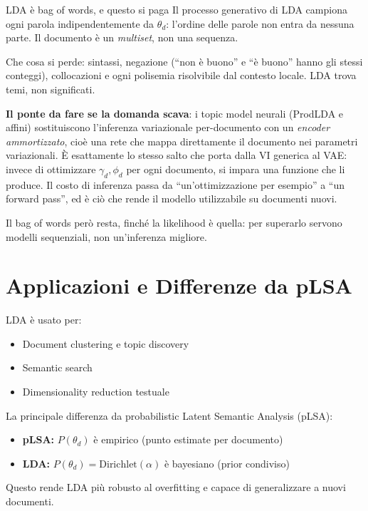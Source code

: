 \begin{trappola}{LDA è bag of words, e questo si paga}
Il processo generativo di LDA campiona ogni parola indipendentemente da $\theta_d$: l'ordine delle parole non entra da nessuna parte. Il documento è un \emph{multiset}, non una sequenza.

Che cosa si perde: sintassi, negazione (``non è buono'' e ``è buono'' hanno gli stessi conteggi), collocazioni e ogni polisemia risolvibile dal contesto locale. LDA trova temi, non significati.

\textbf{Il ponte da fare se la domanda scava}: i topic model neurali (ProdLDA e affini) sostituiscono l'inferenza variazionale per-documento con un \emph{encoder ammortizzato}, cioè una rete che mappa direttamente il documento nei parametri variazionali. È esattamente lo stesso salto che porta dalla VI generica al VAE: invece di ottimizzare $\gamma_d, \phi_d$ per ogni documento, si impara una funzione che li produce. Il costo di inferenza passa da ``un'ottimizzazione per esempio'' a ``un forward pass'', ed è ciò che rende il modello utilizzabile su documenti nuovi.

Il bag of words però resta, finché la likelihood è quella: per superarlo servono modelli sequenziali, non un'inferenza migliore.
\end{trappola}

\section{Applicazioni e Differenze da pLSA}

LDA è usato per:
\begin{itemize}
  \item Document clustering e topic discovery
  \item Semantic search
  \item Dimensionality reduction testuale
\end{itemize}

La principale differenza da probabilistic Latent Semantic Analysis (pLSA):
\begin{itemize}
  \item \textbf{pLSA:} $P(\theta_d)$ è empirico (punto estimate per documento)
  \item \textbf{LDA:} $P(\theta_d) = \text{Dirichlet}(\alpha)$ è bayesiano (prior condiviso)
\end{itemize}

Questo rende LDA più robusto al overfitting e capace di generalizzare a nuovi documenti.

